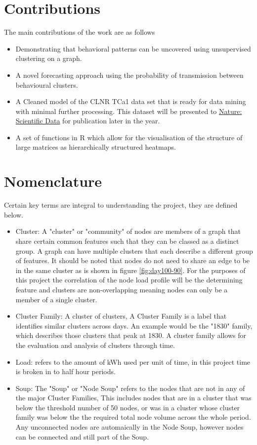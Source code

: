 \section{Contributions}
The main contributions of the work are as follows
\begin{itemize}
\itemsep0em 
    \item Demonstrating that behavioral patterns can be uncovered using unsupervised clustering on a graph.
    \item A novel forecasting approach using the probability of transmission between behavioural clusters.
    \item A Cleaned model of the CLNR TCa1 data set that is ready for data mining with minimal further processing. This dataset will be presented to \href{http://www.nature.com/sdata/about}{Nature: Scientific Data} for publication later in the year.
    \item A set of functions in R which allow for the visualisation of the structure of large matrices as hierarchically structured heatmaps.
\end{itemize}


\section{Nomenclature}
Certain key terms are integral to understanding the project, they are defined below.
\begin{itemize}
\itemsep0em 
    \item Cluster: A "cluster" or "community" of nodes are members of a graph that share certain common features such that they can be classed as a distinct group. A graph can have multiple clusters that each describe a different group of features. It should be noted that nodes do not need to share an edge to be in the same cluster as is shown in figure \ref{fig:day100-90}. For the purposes of this project the correlation of the node load profile will be the determining feature and clusters are non-overlapping meaning nodes can only be a member of a single cluster.
    \item Cluster Family: A cluster of clusters, A Cluster Family is a label that identifies similar clusters across days. An example would be the "1830" family, which describes those clusters that peak at 1830. A cluster family allows for the evaluation and analysis of clusters through time.
    \item Load: refers to the amount of kWh used per unit of time, in this project time is broken in to half hour periods.
    \item Soup: The "Soup" or "Node Soup" refers to the nodes that are not in any of the major Cluster Families, This includes nodes that are in a cluster that was below the threshold number of 50 nodes, or was in a cluster whose cluster family was below the the required total node volume across the whole period. Any unconnected nodes are automaically in the Node Soup, however nodes can be connected and still part of the Soup.
    \end{itemize}